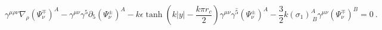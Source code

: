 \begin{equation}   
	 \gamma^{\mu\rho\nu}\nabla_{\rho}(\Psi^\mp_{\nu})^{A}-\gamma^{\mu\nu}\gamma^{5}\partial_{5}(\Psi^\pm_{\nu})^{A}-k\epsilon\tanh\left(k|y|-\frac{k\pi r_{c}}{2}\right)\gamma^{\mu\nu}\gamma^{\hat{5}}(\Psi^\pm_{\nu})^{A}-\frac{3}{2}k(\sigma_1)^{A}_{\;B}\gamma^{\mu\nu}(\Psi^\mp_{\nu})^{B}=0\ .
       \end{equation} 

